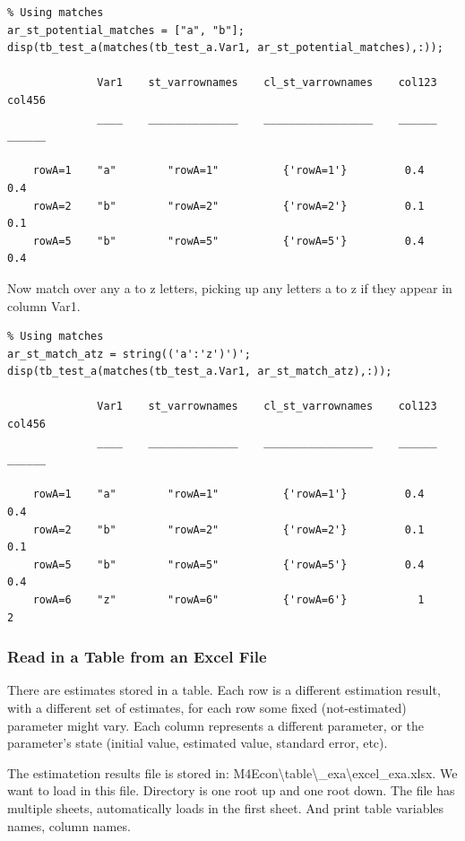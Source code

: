 \documentclass[
]{book}
\begin{document}
\begin{verbatim}
% Using matches
ar_st_potential_matches = ["a", "b"];
disp(tb_test_a(matches(tb_test_a.Var1, ar_st_potential_matches),:));

              Var1    st_varrownames    cl_st_varrownames    col123    col456
              ____    ______________    _________________    ______    ______

    rowA=1    "a"        "rowA=1"          {'rowA=1'}         0.4       0.4  
    rowA=2    "b"        "rowA=2"          {'rowA=2'}         0.1       0.1  
    rowA=5    "b"        "rowA=5"          {'rowA=5'}         0.4       0.4  
\end{verbatim}

Now match over any a to z letters, picking up any letters a to z if they
appear in column Var1.

\begin{verbatim}
% Using matches
ar_st_match_atz = string(('a':'z')')';
disp(tb_test_a(matches(tb_test_a.Var1, ar_st_match_atz),:));

              Var1    st_varrownames    cl_st_varrownames    col123    col456
              ____    ______________    _________________    ______    ______

    rowA=1    "a"        "rowA=1"          {'rowA=1'}         0.4       0.4  
    rowA=2    "b"        "rowA=2"          {'rowA=2'}         0.1       0.1  
    rowA=5    "b"        "rowA=5"          {'rowA=5'}         0.4       0.4  
    rowA=6    "z"        "rowA=6"          {'rowA=6'}           1         2  
\end{verbatim}

\hypertarget{read-in-a-table-from-an-excel-file}{%
\subsubsection{Read in a Table from an Excel File}\label{read-in-a-table-from-an-excel-file}}

There are estimates stored in a table. Each row is a different
estimation result, with a different set of estimates, for each row some
fixed (not-estimated) parameter might vary. Each column represents a
different parameter, or the parameter's state (initial value, estimated
value, standard error, etc).

The estimatetion results file is stored in:
M4Econ\textbackslash table\textbackslash\_exa\textbackslash excel\_exa.xlsx. We want to load in this file.
Directory is one root up and one root down. The file has multiple
sheets, automatically loads in the first sheet. And print table
variables names, column names.
\end{document}
